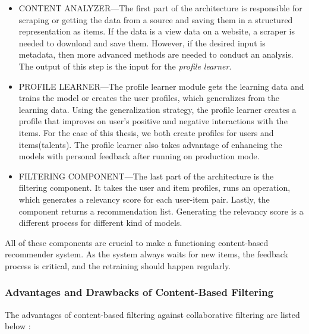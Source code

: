 \begin{itemize}
	\item CONTENT ANALYZER—The first part of the architecture is responsible for scraping or getting the data from a source and saving them in a structured representation as items. If the data is a view data on a website, a scraper is needed to download and save them. However, if the desired input is metadata, then more advanced methods are needed to conduct an analysis. The output of this step is the input for the \textit{profile learner}.
	\item PROFILE LEARNER—The profile learner module gets the learning data and trains the model or creates the user profiles, which generalizes from the learning data. Using the generalization strategy, the profile learner creates a profile that improves on user's positive and negative interactions with the items. For the case of this thesis, we both create profiles for users and items(talents). The profile learner also takes advantage of enhancing the models with personal feedback after running on production mode.
	\item FILTERING COMPONENT—The last part of the architecture is the filtering component. It takes the user and item profiles, runs an operation, which generates a relevancy score for each user-item pair. Lastly, the component returns a recommendation list. Generating the relevancy score is a different process for different kind of models.
\end{itemize}

All of these components are crucial to make a functioning content-based recommender system. As the system always waits for new items, the feedback process is critical, and the retraining should happen regularly.


\subsubsection{Advantages and Drawbacks of Content-Based Filtering}

The advantages of content-based filtering against collaborative filtering are listed below \cite{de2015semantics}:

